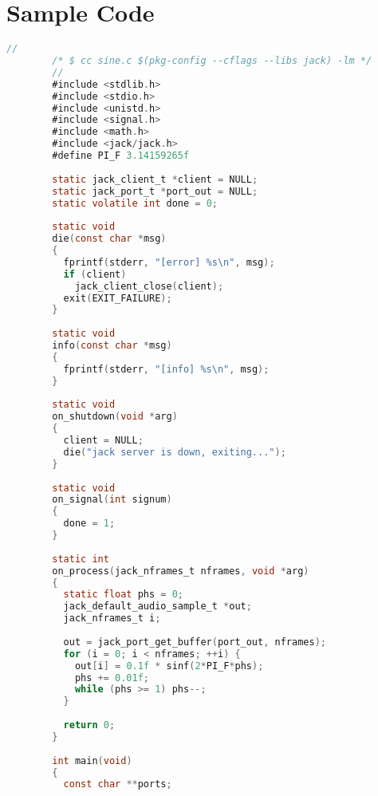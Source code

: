 \documentclass[a4paper]{article}
\begin{document}
\section{Sample Code}
    \begin{lstlisting}[language=C,caption={Example C code},  basicstyle=\ttfamily\small, label=lst:c]
        //
        /* $ cc sine.c $(pkg-config --cflags --libs jack) -lm */
        //
        #include <stdlib.h>
        #include <stdio.h>
        #include <unistd.h>
        #include <signal.h>
        #include <math.h>
        #include <jack/jack.h>
        #define PI_F 3.14159265f
        
        static jack_client_t *client = NULL;
        static jack_port_t *port_out = NULL;
        static volatile int done = 0;
        
        static void
        die(const char *msg)
        {
          fprintf(stderr, "[error] %s\n", msg);
          if (client)
            jack_client_close(client);
          exit(EXIT_FAILURE);
        }
        
        static void
        info(const char *msg)
        {
          fprintf(stderr, "[info] %s\n", msg);
        }
        
        static void
        on_shutdown(void *arg)
        {
          client = NULL;
          die("jack server is down, exiting...");
        }
        
        static void
        on_signal(int signum)
        {
          done = 1;
        }
        
        static int
        on_process(jack_nframes_t nframes, void *arg)
        {
          static float phs = 0;
          jack_default_audio_sample_t *out;
          jack_nframes_t i;
        
          out = jack_port_get_buffer(port_out, nframes);
          for (i = 0; i < nframes; ++i) {
            out[i] = 0.1f * sinf(2*PI_F*phs);
            phs += 0.01f;
            while (phs >= 1) phs--;
          }
        
          return 0;
        }
        
        int main(void)
        {
          const char **ports;
        

\end{lstlisting}
\end{document}
